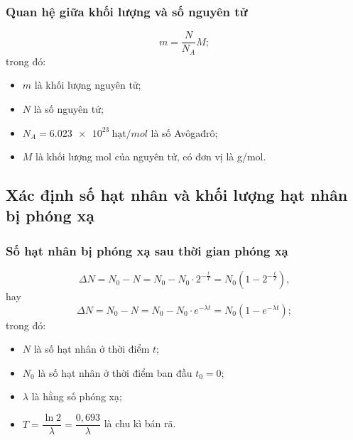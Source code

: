 	\subsubsection{Quan hệ giữa khối lượng và số nguyên tử}
	\begin{equation}
	m=\dfrac{N}{N_A}M;
	\end{equation}
	trong đó:
	\begin{itemize}
		\item $m$ là khối lượng nguyên tử;
		\item $N$ là số nguyên tử;
		\item $N_A=\SI{6,023e23}{\text{hạt}/mol}$ là số Avôgađrô;
		\item $M$ là khối lượng mol của nguyên tử, có đơn vị là g/mol.
	\end{itemize}

\subsection{Xác định số hạt nhân và khối lượng hạt nhân bị phóng xạ}
	
	\subsubsection{Số hạt nhân bị phóng xạ sau thời gian phóng xạ}
	\begin{equation}
	\Delta N = N_0 - N = N_0 - N_0\cdot 2^{-\frac{t}{T}} = N_0\left( 1-2^{-\frac{t}{T}}\right),
	\end{equation}
	hay
	\begin{equation}
	\Delta N = N_0 - N = N_0 - N_0\cdot e^{-\lambda t} = N_0\left( 1-e^{-\lambda t}\right);
	\end{equation}
	trong đó:
	\begin{itemize}
		\item $N$ là số hạt nhân ở thời điểm $t$;
		\item $N_0$ là số hạt nhân ở thời điểm ban đầu $t_0=0$;
		\item $\lambda$ là hằng số phóng xạ;
		\item $T=\dfrac{\ln2}{\lambda}=\dfrac{0,693}{\lambda}$ là chu kì bán rã.
	\end{itemize}
